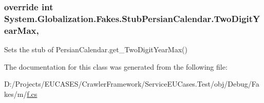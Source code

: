 \hypertarget{class_system_1_1_globalization_1_1_fakes_1_1_stub_persian_calendar_a51f7ac1714390c78a9334fda738cef70}{
\subsubsection[{Two\-Digit\-Year\-Max}]{\setlength{\rightskip}{0pt plus 5cm}override int System.\-Globalization.\-Fakes.\-Stub\-Persian\-Calendar.\-Two\-Digit\-Year\-Max\hspace{0.3cm}{\ttfamily [get]}, {\ttfamily [set]}}}\label{class_system_1_1_globalization_1_1_fakes_1_1_stub_persian_calendar_a51f7ac1714390c78a9334fda738cef70}


Sets the stub of Persian\-Calendar.\-get\-\_\-\-Two\-Digit\-Year\-Max()



The documentation for this class was generated from the following file\-:\begin{DoxyCompactItemize}
\item 
D\-:/\-Projects/\-E\-U\-C\-A\-S\-E\-S/\-Crawler\-Framework/\-Service\-E\-U\-Cases.\-Test/obj/\-Debug/\-Fakes/m/\hyperlink{m_2f_8cs}{f.\-cs}\end{DoxyCompactItemize}
